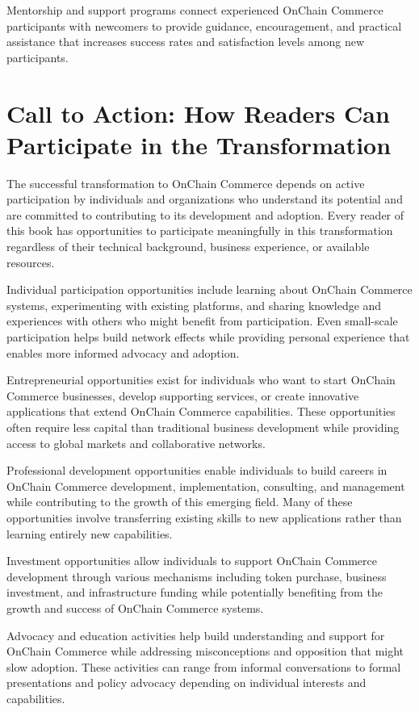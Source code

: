 \documentclass[
  Letterpaper,
]{scrbook}
\begin{document}
Mentorship and support programs connect experienced OnChain Commerce
participants with newcomers to provide guidance, encouragement, and
practical assistance that increases success rates and satisfaction
levels among new participants.

\section{Call to Action: How Readers Can Participate in the
Transformation}\label{call-to-action-how-readers-can-participate-in-the-transformation}

The successful transformation to OnChain Commerce depends on active
participation by individuals and organizations who understand its
potential and are committed to contributing to its development and
adoption. Every reader of this book has opportunities to participate
meaningfully in this transformation regardless of their technical
background, business experience, or available resources.

Individual participation opportunities include learning about OnChain
Commerce systems, experimenting with existing platforms, and sharing
knowledge and experiences with others who might benefit from
participation. Even small-scale participation helps build network
effects while providing personal experience that enables more informed
advocacy and adoption.

Entrepreneurial opportunities exist for individuals who want to start
OnChain Commerce businesses, develop supporting services, or create
innovative applications that extend OnChain Commerce capabilities. These
opportunities often require less capital than traditional business
development while providing access to global markets and collaborative
networks.

Professional development opportunities enable individuals to build
careers in OnChain Commerce development, implementation, consulting, and
management while contributing to the growth of this emerging field. Many
of these opportunities involve transferring existing skills to new
applications rather than learning entirely new capabilities.

Investment opportunities allow individuals to support OnChain Commerce
development through various mechanisms including token purchase,
business investment, and infrastructure funding while potentially
benefiting from the growth and success of OnChain Commerce systems.

Advocacy and education activities help build understanding and support
for OnChain Commerce while addressing misconceptions and opposition that
might slow adoption. These activities can range from informal
conversations to formal presentations and policy advocacy depending on
individual interests and capabilities.
\end{document}
